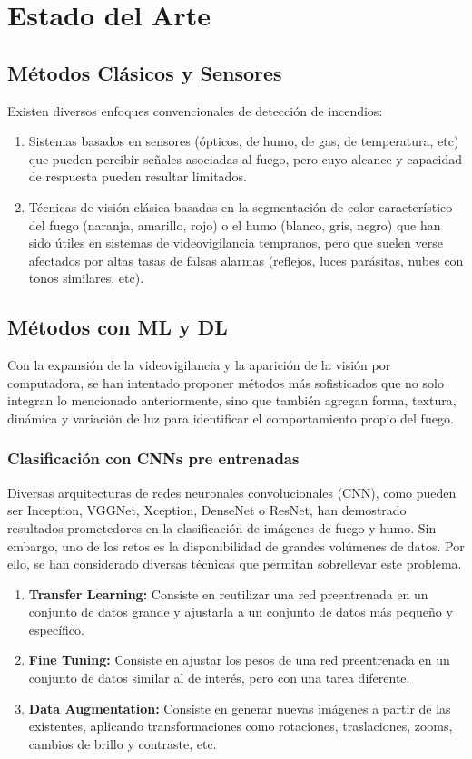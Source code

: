 \section{Estado del Arte}

\subsection{Métodos Clásicos y Sensores}
Existen diversos enfoques convencionales de detección de incendios:
\begin{enumerate}
    \item Sistemas basados en sensores (ópticos, de humo, de gas, de temperatura, etc)
    que pueden percibir señales asociadas al fuego, pero cuyo alcance y capacidad de
    respuesta pueden resultar limitados.
    \item Técnicas de visión clásica basadas en la segmentación de color característico
    del fuego (naranja, amarillo, rojo) o el humo (blanco, gris, negro) que han sido
    útiles en sistemas de videovigilancia tempranos, pero que suelen verse
    afectados por altas tasas de falsas alarmas (reflejos, luces parásitas, nubes con
    tonos similares, etc).
\end{enumerate}

\subsection{Métodos con ML y DL}
Con la expansión de la videovigilancia y la aparición de la visión por computadora,
se han intentado proponer métodos más sofisticados que no solo integran lo mencionado
anteriormente, sino que también agregan forma, textura, dinámica y variación de luz
para identificar el comportamiento propio del fuego.

\subsubsection{Clasificación con CNNs pre entrenadas}
Diversas arquitecturas de redes neuronales convolucionales (CNN), como pueden ser Inception,
VGGNet, Xception, DenseNet o ResNet, han demostrado resultados prometedores en la
clasificación de imágenes de fuego y humo. Sin embargo, uno de los retos es la
disponibilidad de grandes volúmenes de datos. Por ello, se han considerado diversas técnicas
que permitan sobrellevar este problema.

\begin{enumerate}
    \item \textbf{Transfer Learning:} Consiste en reutilizar una red preentrenada en un
    conjunto de datos grande y ajustarla a un conjunto de datos más pequeño y específico.
    \item \textbf{Fine Tuning:} Consiste en ajustar los pesos de una red preentrenada
    en un conjunto de datos similar al de interés, pero con una tarea diferente.
    \item \textbf{Data Augmentation:} Consiste en generar nuevas imágenes a partir de
    las existentes, aplicando transformaciones como rotaciones, traslaciones, zooms,
    cambios de brillo y contraste, etc.
\end{enumerate}

